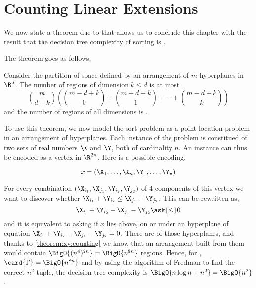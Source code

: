 \section{Counting Linear Extensions}
\label{tree:xy:counting}

We now state a theorem due to \citet*{buck:1943} that allows us to conclude
this chapter with the result that the decision tree complexity of sorting \XY
is .

The theorem goes as follows,

\begin{theorem}\label{theorem:xy:counting}
Consider the partition of space defined by an arrangement of $m$ hyperplanes in
$\R^d$.
The number of regions of dimension $k \le d$ is at most
$$
{m\choose d-k}\left({m - d+k \choose 0} + {m - d+k \choose 1} + \cdots + {m - d+k \choose k}\right)
$$
and the number of regions of all dimensions is .
\end{theorem}

To use this theorem, we now model the sort \XY problem as a point location problem in an
arrangement of hyperplanes. Each instance of the problem is constitued of two
sets of real numbers $\X$ and $\Y$, both of cardinality $n$. An instance can
thus be encoded as a vertex in $\R^{2n}$. Here is a possible encoding,

$$x = (\X_1, \ldots, \X_n, \Y_1, \ldots, \Y_n)$$

For every combination $(\X_{i_1}, \X_{j_1}, \Y_{i_2}, \Y_{j_2})$ of $4$
components of this vertex we want to discover whether $\X_{i_1} + \Y_{i_2} \le
\X_{j_1} + \Y_{j_2}$. This can be rewritten as,
$$\X_{i_1} + \Y_{i_2} - \X_{j_1} - \Y_{j_2} \ask{\le} 0$$
and it is equivalent to asking if $x$ lies above, on or under an
hyperplane of equation $\X_{i_1} + \Y_{i_2} - \X_{j_1} - \Y_{j_2} = 0$. There
are  of those hyperplanes, and thanks to \ref{theorem:xy:counting}
we know that an arrangement built from them would contain
$\BigO{(n^4)^{2n}} = \BigO{n^{8n}}$ regions. Hence, for \XY, $\card{\Gamma} =
\BigO{n^{8n}}$ and by using the algorithm of Fredman to find the correct
$n^2$-tuple, the decision tree complexity is
$\BigO{n \log n + n^2} = \BigO{n^2}$.


